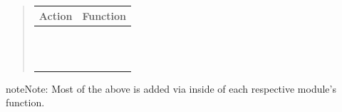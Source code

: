 \documentclass[letterpaper,10pt,openany]{sphinxmanual}
\begin{document}
\begin{fulllineitems}
\begin{fulllineitems}
\begin{fulllineitems}
\begin{quote}
\begin{tabulary}{\linewidth}{|L|L|}
\hline
\textsf{\relax 
Action
} & \textsf{\relax 
Function
}\\
\hline
{}
 & 
{\hyperref[Developer/js_gateone:GateOne.User.storeSessionAction]{}}
\\
\hline
{}
 & 
\\
\hline
{}
 & 
{\hyperref[Developer/js_gateone:GateOne.Utils.loadStyleAction]{}}
\\
\hline
{}
 & 
{\hyperref[Developer/js_gateone:GateOne.Net.log]{}}
\\
\hline
{}
 & 
{\hyperref[Developer/js_gateone:GateOne.Visual.serverMessageAction]{}}
\\
\hline
{}
 & 
{\hyperref[Developer/js_gateone:GateOne.Visual.userMessageAction]{}}
\\
\hline
{}
 & 
{\hyperref[Developer/js_gateone:GateOne.Net.ping]{}}
\\
\hline
{}
 & 
{\hyperref[Developer/js_gateone:GateOne.Net.pong]{}}
\\
\hline
{}
 & 
{\hyperref[Developer/js_gateone:GateOne.Net.reauthenticate]{}}
\\
\hline
{}
 & 
{\hyperref[Developer/js_gateone:GateOne.Utils.saveAsAction]{}}
\\
\hline
{}
 & 
{\hyperref[Developer/js_gateone:GateOne.User.setUsernameAction]{}}
\\
\hline
{}
 & 
\\
\hline\end{tabulary}

\end{quote}

\begin{notice}{note}{Note:}
Most of the above is added via {\hyperref[Developer/js_gateone:GateOne.Net.addAction]{}} inside of each respective module's  function.
\end{notice}


\end{fulllineitems}
\end{fulllineitems}
\end{fulllineitems}
\end{document}
